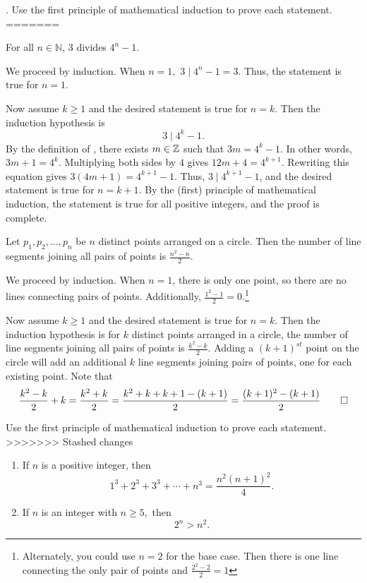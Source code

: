 \documentclass{ximera}
\begin{document}
\begin{br}
. Use the first principle of mathematical induction to prove each statement.
=======
  \begin{theorem}
    For all $n\in\mathbb{N}$, 3 divides $4^{n}-1$.
  \end{theorem}
    \begin{solution}
      We proceed by induction.  When $n=1,$ $3\mid 4^n-1=3$. Thus, the statement is true for $n=1.$

      Now assume $k\geq 1$ and the desired statement is true for $n=k$. Then the induction hypothesis is \[3\mid 4^k-1.\]
      By the definition of , there exists $m\in\mathbb Z$ such that $3m=4^k-1.$ In other words, $3m+1=4^k$. Multiplying both sides by $4$ gives $12m+4=4^{k+1}$. Rewriting this equation gives $3(4m+1)=4^{k+1}-1$. Thus, $3\mid 4^{k+1}-1$, and the desired statement is true for $n=k+1$. By the (first) principle of mathematical induction, the statement is true for all positive integers, and the proof is complete.
    \end{solution}

  \begin{theorem}
    Let $p_{1}, p_{2}, \ldots, p_{n}$ be $n$ distinct points arranged on a circle.  Then the number of line segments joining all pairs of points is $\frac{n^{2}-n}{2}$.
  \end{theorem}
    \begin{solution}
      We proceed by induction. When $n=1$, there is only one point, so there are no lines connecting pairs of points. Additionally, $\frac{1^2-1}{2}=0$.\footnote{Alternately, you could use $n=2$ for the base case. Then there is one line connecting the only pair of points and $\frac{2^2-2}{2}=1$}
      
      Now assume $k\geq 1$ and the desired statement is true for $n=k$. Then the induction hypothesis is for $k$ distinct points arranged in a circle, the number of line segments joining all pairs of points is $\frac{k^{2}-k}{2}$. Adding a $(k+1)^{st}$ point on the circle will add an additional $k$ line segments joining pairs of points, one for each existing point. Note that 
      \[ 
        \frac{k^{2}-k}{2}+k=\frac{k^{2}+k}{2}=
        \frac{k^2+k+k+1-(k+1)}{2}=\frac{(k+1)^{2}-(k+1)}{2}\qedhere
      \]
    \end{solution}
\end{br}

\begin{br}
  Use the first principle of mathematical induction to prove each statement.
>>>>>>> Stashed changes
  \begin{enumerate}
    \item If $n$ is a positive integer, then 
  \[1^3+2^3+3^3+\cdots+n^3=\frac{n^2(n+1)^2}{4}.\]
  
    \item If $n$ is an integer with $n\geq 5,$ then \[2^n>n^2.\]
 
  \end{enumerate}
\end{br}
\end{document}
